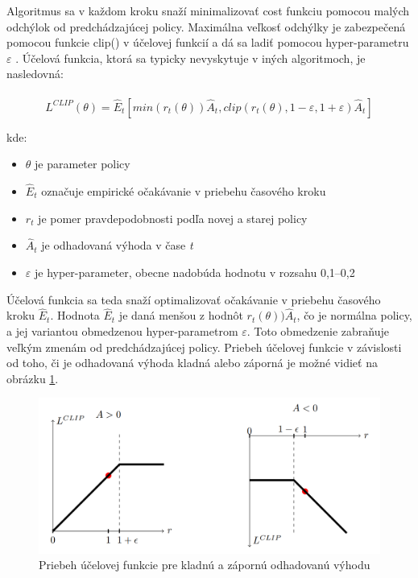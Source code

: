 \documentclass[slovak, master]{diploma}
\begin{document}
Algoritmus sa v každom kroku snaží minimalizovať cost funkciu pomocou malých odchýlok od predchádzajúcej policy. Maximálna veľkosť odchýlky je zabezpečená pomocou funkcie clip() v účelovej funkcií a dá sa ladiť pomocou hyper-parametru \(\varepsilon\) \cite{PPOPaper}. Účelová funkcia, ktorá sa typicky nevyskytuje v iných algoritmoch, je nasledovná:
\\\\
\[L^{CLIP}(\theta) = \hat{E}_t [min(r_t(\theta))\hat{A}_t, clip(r_t(\theta), 1 - \varepsilon, 1 + \varepsilon)\hat{A}_t]\]

kde:
\begin{itemize}
  \item \(\theta\) je parameter policy
  \item \(\hat{E}_t\) označuje empirické očakávanie v priebehu časového kroku
  \item \(r_t\) je pomer pravdepodobnosti podľa novej a starej policy
  \item \(\hat{A}_t\) je odhadovaná výhoda v čase \textit{t}
  \item \(\varepsilon\) je hyper-parameter, obecne nadobúda hodnotu v rozsahu 0,1--0,2
\end{itemize}

Účelová funkcia sa teda snaží optimalizovať očakávanie v priebehu časového kroku \(\hat{E}_t\). Hodnota \(\hat{E}_t\) je daná menšou z hodnôt \(r_t(\theta))\hat{A}_t\), čo je normálna policy, a jej variantou obmedzenou hyper-parametrom \(\varepsilon\). Toto obmedzenie zabraňuje veľkým zmenám od predchádzajúcej policy. Priebeh účelovej funkcie v závislosti od toho, či je odhadovaná výhoda kladná alebo záporná je možné vidieť na obrázku \ref{pic:clipping}.

\begin{figure}[!htbp]
    \centering
    \includegraphics[width=.7\textwidth]{Figures/clip.png}
    \caption{Priebeh účelovej funkcie pre kladnú a zápornú odhadovanú výhodu \cite{PPOPaper}}
    \label{pic:clipping}
\end{figure}

\end{document}
